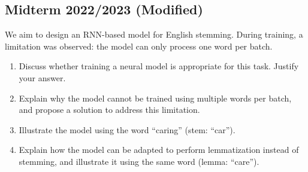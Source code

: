 \documentclass{../extra/aakpract/aakpract}
\begin{document}
	\subsection{Midterm 2022/2023 (Modified)}
	
	We aim to design an RNN-based model for English stemming.
	 During training, a limitation was observed: the model can only process one word per batch.
	
	\begin{enumerate}
		\item Discuss whether training a neural model is appropriate for this task. Justify your answer.
		
		\item Explain why the model cannot be trained using multiple words per batch, and propose a solution to address this limitation.
		
		\item Illustrate the model using the word ``caring'' (stem: ``car'').
		
		\item Explain how the model can be adapted to perform lemmatization instead of stemming, and illustrate it using the same word (lemma: ``care'').
	\end{enumerate}
	
	
\end{document}
